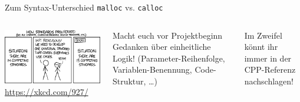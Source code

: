 \begin{frame}{Zum Syntax-Unterschied \texttt{malloc} vs. \texttt{calloc}}
%
\begin{columns}
\begin{center}
\includegraphics[width=\linewidth]{./gfx/xkcd_standards}
\newline
\tiny\url{https://xkcd.com/927/}
\end{center}
%
\begin{hintbox}
Macht euch vor Projektbeginn Gedanken über einheitliche Logik! (Parameter-Reihenfolge, Variablen-Benennung, Code-Struktur, \ldots)
\end{hintbox}
%
\begin{hintbox}
Im Zweifel könnt ihr immer in der CPP-Referenz nachschlagen!
\end{hintbox}
\end{columns}
%
\end{frame}


